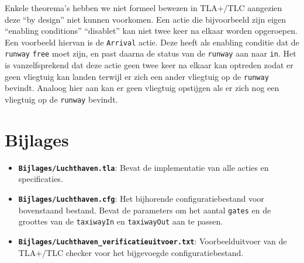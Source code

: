 Enkele theorema's hebben we niet formeel bewezen in TLA+/TLC aangezien deze ``by design'' niet kunnen voorkomen. Een actie die bijvoorbeeld zijn eigen ``enabling conditions'' ``disablet'' kan niet twee keer na elkaar worden opgeroepen. Een voorbeeld hiervan is de \texttt{Arrival} actie. Deze heeft als enabling conditie dat de \texttt{runway} \texttt{free} moet zijn, en past daarna de status van de \texttt{runway} aan naar \texttt{in}. Het is vanzelfsprekend dat deze actie geen twee keer na elkaar kan optreden zodat er geen vliegtuig kan landen terwijl er zich een ander vliegtuig op de \texttt{runway} bevindt. Analoog hier aan kan er geen vliegtuig opstijgen als er zich nog een vliegtuig op de \texttt{runway} bevindt.

\section{Bijlages}
\begin{itemize}
\item \textbf{\texttt{Bijlages/Luchthaven.tla}}: Bevat de implementatie van alle acties en specificaties.

\item \textbf{\texttt{Bijlages/Luchthaven.cfg}}: Het bijhorende configuratiebestand voor bovenstaand bestand. Bevat de parameters om het aantal \texttt{gates} en de groottes van de \texttt{taxiwayIn} en \texttt{taxiwayOut} aan te passen.

\item \textbf{\texttt{Bijlages/Luchthaven\_verificatieuitvoer.txt}}: Voorbeelduitvoer van de TLA+/TLC checker voor het bijgevoegde configuratiebestand.
\end{itemize}